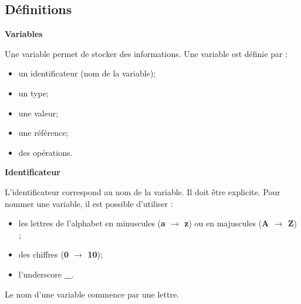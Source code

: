 \documentclass[10pt,fleqn]{article} %
\begin{document}
\subsection{Définitions}
\begin{defi}
\textbf{Variables}

Une variable permet de stocker des informations. Une variable est définie par :
 \begin{multicols}{2}
\begin{itemize}
\item un identificateur (nom de la variable);
\item un type;
\item une valeur;
\item une référence;
\item des opérations. 
\end{itemize}
\end{multicols}
\end{defi}



\begin{defi}
\textbf{Identificateur}

L'identificateur correspond au nom de la variable. Il doit être explicite. Pour nommer une variable, il est possible d'utiliser :
\begin{itemize}
\item les lettres de l'alphabet en minuscules (\textbf{a $\rightarrow$ z}) ou en majuscules (\textbf{A $\rightarrow$ Z}) ;
\item des chiffres (\textbf{0 $\rightarrow$ 10});
\item l'underscore \textbf{\_}.
\end{itemize}

Le nom d'une variable commence par une lettre.

\end{defi}

\end{document}

